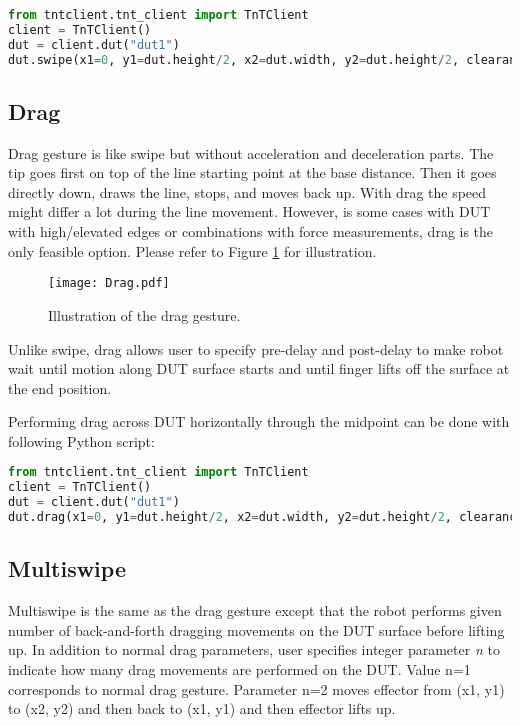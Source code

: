 \begin{lstlisting}[language=Python]
from tntclient.tnt_client import TnTClient
client = TnTClient()
dut = client.dut("dut1")
dut.swipe(x1=0, y1=dut.height/2, x2=dut.width, y2=dut.height/2, clearance=0, radius=6)
\end{lstlisting}

\subsection{\label{sec:drag}Drag}
Drag gesture is like swipe but without acceleration and deceleration parts. The tip goes first on top of the line starting point at the base distance. Then it goes directly down, draws the line, stops, and moves back up. With drag the speed might differ a lot during the line movement. However, is some cases with DUT with high/elevated edges or combinations with force measurements, drag is the only feasible option. Please refer to Figure \ref{fig:drag_gesture} for illustration.

\begin{figure}[h]
	\centering
	\texttt{[image: Drag.pdf]}
	\caption{Illustration of the drag gesture.}
	\label{fig:drag_gesture}
\end{figure}

Unlike swipe, drag allows user to specify pre-delay and post-delay to make robot wait until motion along DUT surface starts and until finger lifts off the surface at the end position.

Performing drag across DUT horizontally through the midpoint can be done with following Python script:

\begin{lstlisting}[language=Python]
from tntclient.tnt_client import TnTClient
client = TnTClient()
dut = client.dut("dut1")
dut.drag(x1=0, y1=dut.height/2, x2=dut.width, y2=dut.height/2, clearance=0)
\end{lstlisting}

\subsection{Multiswipe}


Multiswipe is the same as the drag gesture except that the robot performs given number of back-and-forth dragging movements on the DUT surface before lifting up. In addition to normal drag parameters, user specifies integer parameter \emph{n} to indicate how many drag movements are performed on the DUT. Value n=1 corresponds to normal drag gesture. Parameter n=2 moves effector from (x1, y1) to (x2, y2) and then back to (x1, y1) and then effector lifts up.

